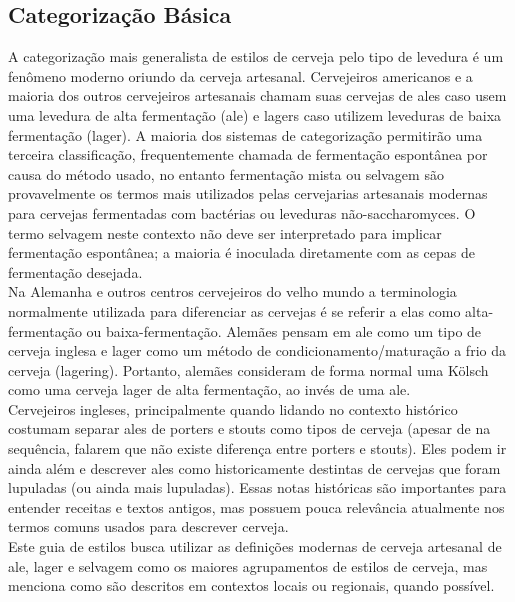 \subsection*{Categorização Básica}
A categorização mais generalista de estilos de cerveja pelo tipo de levedura é um fenômeno moderno oriundo da cerveja artesanal. Cervejeiros americanos e a maioria dos outros cervejeiros artesanais chamam suas cervejas de ales caso usem uma levedura de alta fermentação (ale) e lagers caso utilizem leveduras de baixa fermentação (lager). A maioria dos sistemas de categorização permitirão uma terceira classificação, frequentemente chamada de fermentação espontânea por causa do método usado, no entanto fermentação mista ou selvagem são provavelmente os termos mais utilizados pelas cervejarias artesanais modernas para cervejas fermentadas com bactérias ou leveduras não-saccharomyces. O termo selvagem neste contexto não deve ser interpretado para implicar fermentação espontânea; a maioria é inoculada diretamente com as cepas de fermentação desejada.\\
Na Alemanha e outros centros cervejeiros do velho mundo a terminologia normalmente utilizada para diferenciar as cervejas é se referir a elas como alta-fermentação ou baixa-fermentação. Alemães pensam em ale como um tipo de cerveja inglesa e lager como um método de condicionamento/maturação a frio da cerveja (lagering). Portanto, alemães consideram de forma normal uma Kölsch como uma cerveja lager de alta fermentação, ao invés de uma ale.\\
Cervejeiros ingleses, principalmente quando lidando no contexto histórico costumam separar ales de porters e stouts como tipos de cerveja (apesar de na sequência, falarem que não existe diferença entre porters e stouts). Eles podem ir ainda além e descrever ales como historicamente destintas de cervejas que foram lupuladas (ou ainda mais lupuladas). Essas notas históricas são importantes para entender receitas e textos antigos, mas possuem pouca relevância atualmente nos termos comuns usados para descrever cerveja.\\
Este guia de estilos busca utilizar as definições modernas de cerveja artesanal de ale, lager e selvagem como os maiores agrupamentos de estilos de cerveja, mas menciona como são descritos em contextos locais ou regionais, quando possível.